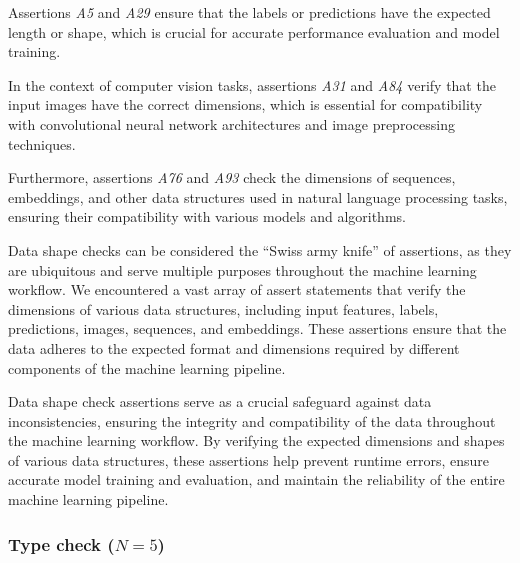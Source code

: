 Assertions \emph{A5} and \emph{A29} ensure that the labels or predictions have the expected length or shape, which is crucial for accurate performance evaluation and model training.

In the context of computer vision tasks, assertions \emph{A31} and \emph{A84} verify that the input images have the correct dimensions, which is essential for compatibility with convolutional neural network architectures and image preprocessing techniques.

Furthermore, assertions \emph{A76} and \emph{A93} check the dimensions of sequences, embeddings, and other data structures used in natural language processing tasks, ensuring their compatibility with various models and algorithms.

Data shape checks can be considered the ``Swiss army knife'' of assertions, as they are ubiquitous and serve multiple purposes throughout the machine learning workflow. We encountered a vast array of assert statements that verify the dimensions of various data structures, including input features, labels, predictions, images, sequences, and embeddings. These assertions ensure that the data adheres to the expected format and dimensions required by different components of the machine learning pipeline.

Data shape check assertions serve as a crucial safeguard against data inconsistencies, ensuring the integrity and compatibility of the data throughout the machine learning workflow. By verifying the expected dimensions and shapes of various data structures, these assertions help prevent runtime errors, ensure accurate model training and evaluation, and maintain the reliability of the entire machine learning pipeline.


\subsubsection{Type check ($N = 5$)}

